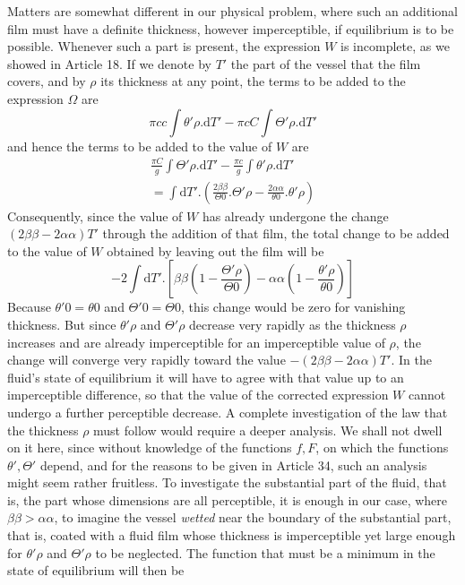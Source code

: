 Matters are somewhat different in our physical problem, where such an additional film must have a definite thickness, however imperceptible, if equilibrium is to be possible. Whenever such a part is present, the expression $W$ is incomplete, as we showed in Article 18. If we denote by $T'$ the part of the vessel that the film covers,
and by $\rho$ its thickness at any point, the terms to be added to the expression $\Omega$ are
\[
\pi cc\int\theta'\rho.\mathrm{d}T'-\pi cC\int\Theta'\rho.\mathrm{d}T'
\]
and hence the terms to be added to the value of $W$ are
\[
\begin{gathered}
\frac{\pi C}g\int\Theta'\rho.\mathrm{d}T'-\frac{\pi c}g\int\theta'\rho.\mathrm{d}T'\\
=\int\mathrm{d}T'.\left(\frac{2\beta\beta}{\Theta0}.\Theta'\rho-\frac{2\alpha\alpha}{\theta0}.\theta'\rho\right)
\end{gathered}
\]
Consequently, since the value of $W$ has already undergone the change $(2\beta\beta-2\alpha\alpha)T'$ through the addition of that film, the total change to be added to the value of $W$ obtained by leaving out the film will be
\[
-2\int\mathrm{d}T'.\left[\beta\beta\left(1-\frac{\Theta'\rho}{\Theta0}\right)-\alpha\alpha\left(1-\frac{\theta'\rho}{\theta0}\right)\right]
\]
Because $\theta'0=\theta0$ and $\Theta'0=\Theta0$, this change would be zero for vanishing thickness. But since $\theta'\rho$ and $\Theta'\rho$ decrease very rapidly as the thickness $\rho$ increases and are already imperceptible for an imperceptible value of $\rho$, the change will converge very rapidly toward the value $-(2\beta\beta-2\alpha\alpha)T'$. In the fluid’s state of equilibrium it will have to agree with that value up to an imperceptible difference, so that the value of the corrected expression $W$ cannot undergo a further perceptible decrease. A complete investigation of the law that the thickness $\rho$ must follow would require a deeper analysis. We shall not dwell on it here, since without knowledge of the functions $f,F$, on which the functions $\theta',\Theta'$ depend, and for the reasons to be given in Article 34, such an analysis might seem rather fruitless. To investigate the substantial part of the fluid, that is, the part whose dimensions are all perceptible, it is enough in our case, where $\beta\beta>\alpha\alpha$, to imagine the vessel \textit{wetted} near the boundary of the substantial part, that is, coated with a fluid film whose thickness is imperceptible yet large enough for $\theta'\rho$ and $\Theta'\rho$ to be neglected. The function that must be a minimum in the state of equilibrium will then be
